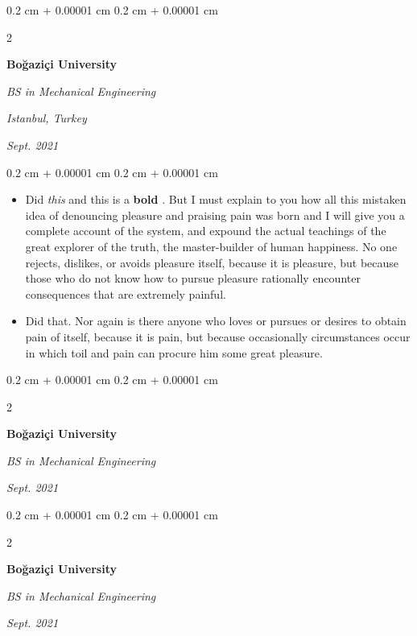 \documentclass[10pt, letterpaper]{article}
\newenvironment{highlights}{
    \begin{itemize}[
        topsep=0.10 cm,
        parsep=0.10 cm,
        partopsep=0pt,
        itemsep=0pt,
        leftmargin=0.4 cm + 10pt
    ]
}{
    \end{itemize}
} %
\newenvironment{onecolentry}{
    \begin{adjustwidth}{
        0.2 cm + 0.00001 cm
    }{
        0.2 cm + 0.00001 cm
    }
}{
    \end{adjustwidth}
} %
\newenvironment{twocolentry}[2][]{
    \onecolentry
    \def\secondColumn{#2}
    \setcolumnwidth{\fill, 4.5 cm}
    \begin{paracol}{2}
}{
    \switchcolumn \raggedleft \secondColumn
    \end{paracol}
    \endonecolentry
} %
\let\hrefWithoutArrow\href
\renewcommand{\href}[2]{\hrefWithoutArrow{#1}{\mbox{\ifthenelse{\equal{#2}{}}{ }{#2 }\raisebox{.15ex}{\footnotesize \faExternalLink*}}}}
\begin{document}
        \vspace{0.2 cm-3px}

        \begin{twocolentry}{
        \textit{Istanbul, Turkey}    
            
        \textit{Sept. 2021}}
            \textbf{Boğaziçi University}

            \textit{BS in Mechanical Engineering}
        \end{twocolentry}

        \vspace{0.10 cm-3px}
        \begin{onecolentry}
            \begin{highlights}
                \item Did \textit{this} and this is a \textbf{bold} \href{https://example.com}{link}. But I must explain to you how all this mistaken idea of denouncing pleasure and praising pain was born and I will give you a complete account of the system, and expound the actual teachings of the great explorer of the truth, the master-builder of human happiness. No one rejects, dislikes, or avoids pleasure itself, because it is pleasure, but because those who do not know how to pursue pleasure rationally encounter consequences that are extremely painful.
                \item Did that. Nor again is there anyone who loves or pursues or desires to obtain pain of itself, because it is pain, but because occasionally circumstances occur in which toil and pain can procure him some great pleasure.
            \end{highlights}
        \end{onecolentry}


        \vspace{0.2 cm-3px}

        \begin{twocolentry}{
            
            
        \textit{Sept. 2021}}
            \textbf{Boğaziçi University}

            \textit{BS in Mechanical Engineering}
        \end{twocolentry}



        \vspace{0.2 cm-3px}

        \begin{twocolentry}{
            
            
        \textit{Sept. 2021}}
            \textbf{Boğaziçi University}

            \textit{BS in Mechanical Engineering}
        \end{twocolentry}
\end{document}
